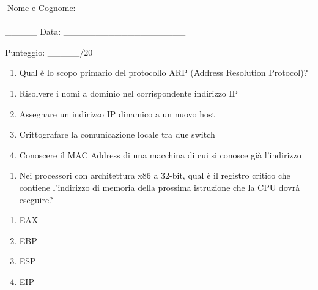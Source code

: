 \documentclass[11pt,a4paper]{article}
\providecommand{\tightlist}{%
  \setlength{\itemsep}{0pt}\setlength{\parskip}{0pt}}
\begin{document}
Nome e Cognome:
\_\_\_\_\_\_\_\_\_\_\_\_\_\_\_\_\_\_\_\_\_\_\_\_\_\_\_\_\_\_\_\_\_\_\_\_\_\_\_\_\_\_\_\_\_\_\_\_\_\_\_\_\_
Data: \_\_\_\_\_\_\_\_\_\_\_\_\_\_\_\_\_\_\_

Punteggio: \_\_\_\_\_/20

\begin{enumerate}
\def\labelenumi{\arabic{enumi}.}
\setcounter{enumi}{18}
\tightlist
\item
  Qual è lo scopo primario del protocollo ARP (Address Resolution
  Protocol)?
\end{enumerate}

\begin{enumerate}
\def\labelenumi{\Alph{enumi})}
\tightlist
\item
  Risolvere i nomi a dominio nel corrispondente indirizzo IP
\item
  Assegnare un indirizzo IP dinamico a un nuovo host
\item
  Crittografare la comunicazione locale tra due switch
\item
  Conoscere il MAC Address di una macchina di cui si conosce già
  l'indirizzo
\end{enumerate}

\begin{enumerate}
\def\labelenumi{\arabic{enumi}.}
\setcounter{enumi}{19}
\tightlist
\item
  Nei processori con architettura x86 a 32-bit, qual è il registro
  critico che contiene l'indirizzo di memoria della prossima istruzione
  che la CPU dovrà eseguire?
\end{enumerate}

\begin{enumerate}
\def\labelenumi{\Alph{enumi})}
\tightlist
\item
  EAX
\item
  EBP
\item
  ESP
\item
  EIP
\end{enumerate}


\end{document}
